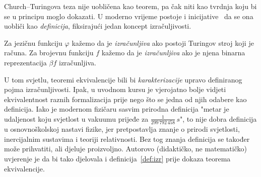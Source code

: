 Church--\!Turingova teza nije uobličena kao teorem, pa čak niti kao tvrdnja koju bi se u principu moglo dokazati. U moderno vrijeme postoje i inicijative~\cite{soare} da se ona uobliči kao \emph{definicija}, fiksirajući jedan koncept izračuljivosti.

\begin{definicija}\label{def:izr}
Za jezičnu funkciju $\varphi$ kažemo da je \emph{izračunljiva} ako postoji Turingov stroj koji je računa.
Za brojevnu funkciju $f$ kažemo da je \emph{izračunljiva} ako je njena binarna reprezentacija $\beta f$ izračunljiva.
\end{definicija}

U tom svjetlu, teoremi ekvivalencije bili bi \emph{karakterizacije} upravo definiranog pojma izračunljivosti. Ipak, u uvodnom kursu je vjerojatno bolje vidjeti ekvivalentnost raznih formalizacija prije nego što se jedna od njih odabere kao definicija. Iako je modernom fizičaru sasvim prirodna definicija "metar je udaljenost koju svjetlost u vakuumu prijeđe za $\frac{1}{299\,792\,458}\,s$", to nije dobra definicija u osnovnoškolskoj nastavi fizike, jer pretpostavlja znanje o prirodi svjetlosti, inercijalnim sustavima i teoriji relativnosti. Bez tog znanja definicija se također može prihvatiti, ali djeluje proizvoljno. Autorovo (didaktičko, ne matematičko) uvjerenje je da bi tako djelovala i definicija~\ref{def:izr} prije dokaza teorema ekvivalencije.


